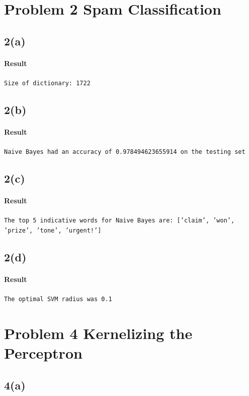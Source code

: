 \documentclass[11pt]{article}
\begin{document}
	\newpage
	\section{Problem 2 Spam Classification}
	\subsection{2(a)}
	\paragraph{Result} \texttt{Size of dictionary: 1722}
	
	\newpage
	\subsection{2(b)}
	\paragraph{Result} \texttt{Naive Bayes had an accuracy of 0.978494623655914 on the testing set}
	
	\newpage
	\subsection{2(c)}
	\paragraph{Result} \texttt{The top 5 indicative words for Naive Bayes are:  ['claim', 'won', 'prize', 'tone', 'urgent!']}
	
	\newpage
	\subsection{2(d)}
	\paragraph{Result} \texttt{The optimal SVM radius was 0.1}
	
	\newpage
	\section{Problem 4 Kernelizing the Perceptron}
	\subsection{4(a)}
\end{document}
